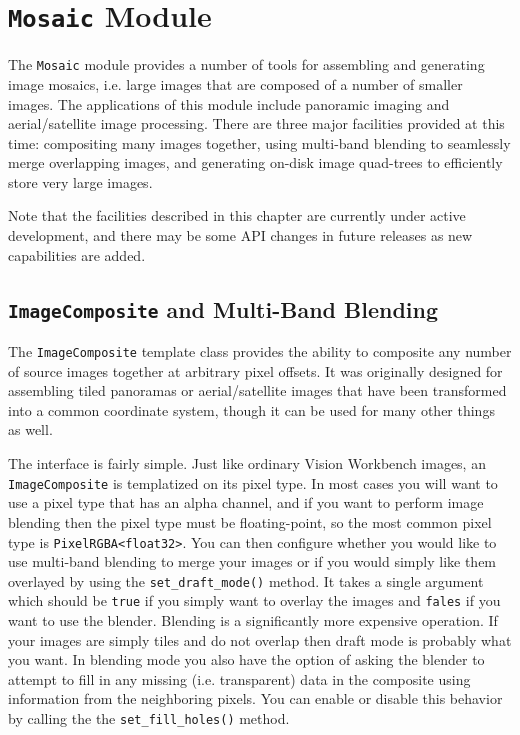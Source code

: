 \chapter{{\tt Mosaic} Module}\label{ch:mosaic-module}

The \verb#Mosaic# module provides a number of tools for assembling and
generating image mosaics, i.e. large images that are composed of a
number of smaller images.  The applications of this module include
panoramic imaging and aerial/satellite image processing.  There are 
three major facilities provided at this time: compositing many images 
together, using multi-band blending to seamlessly merge overlapping 
images, and generating on-disk image quad-trees to efficiently store 
very large images.

Note that the facilities described in this chapter are currently under
active development, and there may be some API changes in future
releases as new capabilities are added.

\section{{\tt ImageComposite} and Multi-Band Blending}\label{sec:imagecomposite}

The \verb#ImageComposite# template class provides the ability to
composite any number of source images together at arbitrary pixel
offsets.  It was originally designed for assembling tiled panoramas or
aerial/satellite images that have been transformed into a common
coordinate system, though it can be used for many other things as
well.

The interface is fairly simple.  Just like ordinary Vision Workbench
images, an \verb#ImageComposite# is templatized on its pixel type.  In
most cases you will want to use a pixel type that has an alpha
channel, and if you want to perform image blending then the pixel type
must be floating-point, so the most common pixel type is
\verb#PixelRGBA<float32>#.  You can then configure whether you would
like to use multi-band blending to merge your images or if you would
simply like them overlayed by using the \verb#set_draft_mode()#
method.  It takes a single argument which should be \verb#true# if you
simply want to overlay the images and \verb#fales# if you want to use
the blender.  Blending is a significantly more expensive operation.
If your images are simply tiles and do not overlap then draft mode is
probably what you want.  In blending mode you also have the option of
asking the blender to attempt to fill in any missing
(i.e. transparent) data in the composite using information from the
neighboring pixels.  You can enable or disable this behavior by
calling the the \verb#set_fill_holes()# method.

